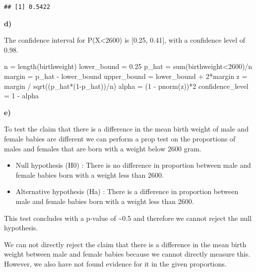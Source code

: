 \documentclass[
]{article}
\newenvironment{Shaded}{\begin{snugshade}}{\end{snugshade}}
\newcommand{\DecValTok}[1]{\textcolor[rgb]{0.00,0.00,0.81}{#1}}
\newcommand{\FloatTok}[1]{\textcolor[rgb]{0.00,0.00,0.81}{#1}}
\newcommand{\FunctionTok}[1]{\textcolor[rgb]{0.00,0.00,0.00}{#1}}
\newcommand{\NormalTok}[1]{#1}
\newcommand{\OtherTok}[1]{\textcolor[rgb]{0.56,0.35,0.01}{#1}}
\newcommand{\SpecialCharTok}[1]{\textcolor[rgb]{0.00,0.00,0.00}{#1}}
\begin{document}
\begin{verbatim}
## [1] 0.5422
\end{verbatim}

\textbf{d)}

The confidence interval for P(X\textless2600) is {[}0.25, 0.41{]}, with
a confidence level of 0.98.

\begin{Shaded}
\begin{Highlighting}[]
\NormalTok{n }\OtherTok{=} \FunctionTok{length}\NormalTok{(birthweight)}
\NormalTok{lower\_bound }\OtherTok{=} \FloatTok{0.25}
\NormalTok{p\_hat }\OtherTok{=} \FunctionTok{sum}\NormalTok{(birthweight}\SpecialCharTok{\textless{}}\DecValTok{2600}\NormalTok{)}\SpecialCharTok{/}\NormalTok{n}
\NormalTok{margin }\OtherTok{=}\NormalTok{ p\_hat }\SpecialCharTok{{-}}\NormalTok{ lower\_bound}
\NormalTok{upper\_bound }\OtherTok{=}\NormalTok{ lower\_bound }\SpecialCharTok{+} \DecValTok{2}\SpecialCharTok{*}\NormalTok{margin}
\NormalTok{z }\OtherTok{=}\NormalTok{ margin }\SpecialCharTok{/} \FunctionTok{sqrt}\NormalTok{((p\_hat}\SpecialCharTok{*}\NormalTok{(}\DecValTok{1}\SpecialCharTok{{-}}\NormalTok{p\_hat))}\SpecialCharTok{/}\NormalTok{n)}
\NormalTok{alpha }\OtherTok{=}\NormalTok{ (}\DecValTok{1} \SpecialCharTok{{-}} \FunctionTok{pnorm}\NormalTok{(z))}\SpecialCharTok{*}\DecValTok{2}
\NormalTok{confidence\_level }\OtherTok{=} \DecValTok{1} \SpecialCharTok{{-}}\NormalTok{ alpha}
\end{Highlighting}
\end{Shaded}

\textbf{e)}

To test the claim that there is a difference in the mean birth weight of
male and female babies are different we can perform a prop test on the
proportions of males and females that are born with a weight below 2600
gram.

\begin{itemize}
\item
  Null hypothesis (H0) : There is no difference in proportion between
  male and female babies born with a weight less than 2600.
\item
  Alternative hypothesis (Ha) : There is a difference in proportion
  between male and female babies born with a weight less than 2600.
\end{itemize}

This test concludes with a p-value of \textasciitilde0.5 and therefore
we cannot reject the null hypothesis.

We can not directly reject the claim that there is a difference in the
mean birth weight between male and female babies because we cannot
directly measure this. However, we also have not found evidence for it
in the given proportions.
\end{document}

